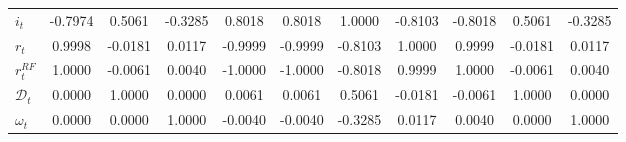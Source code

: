 \begin{center}
\begin{longtable}{lcccccccccc}
$i_t            $	 & 	          -0.7974	 & 	           0.5061	 & 	          -0.3285	 & 	           0.8018	 & 	           0.8018	 & 	           1.0000	 & 	          -0.8103	 & 	          -0.8018	 & 	           0.5061	 & 	          -0.3285 \\ 
$r_t            $	 & 	           0.9998	 & 	          -0.0181	 & 	           0.0117	 & 	          -0.9999	 & 	          -0.9999	 & 	          -0.8103	 & 	           1.0000	 & 	           0.9999	 & 	          -0.0181	 & 	           0.0117 \\ 
$r^{RF}_t       $	 & 	           1.0000	 & 	          -0.0061	 & 	           0.0040	 & 	          -1.0000	 & 	          -1.0000	 & 	          -0.8018	 & 	           0.9999	 & 	           1.0000	 & 	          -0.0061	 & 	           0.0040 \\ 
$\mathcal{D}_t  $	 & 	           0.0000	 & 	           1.0000	 & 	           0.0000	 & 	           0.0061	 & 	           0.0061	 & 	           0.5061	 & 	          -0.0181	 & 	          -0.0061	 & 	           1.0000	 & 	           0.0000 \\ 
$\omega_t       $	 & 	           0.0000	 & 	           0.0000	 & 	           1.0000	 & 	          -0.0040	 & 	          -0.0040	 & 	          -0.3285	 & 	           0.0117	 & 	           0.0040	 & 	           0.0000	 & 	           1.0000 \\ 
\end{longtable}
 \end{center}
